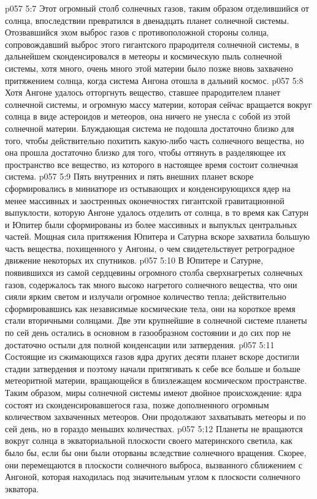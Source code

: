 \vs p057 5:7 Этот огромный столб солнечных газов, таким образом отделившийся от солнца, впоследствии превратился в двенадцать планет солнечной системы. Отозвавшийся эхом выброс газов с противоположной стороны солнца, сопровождавший выброс этого гигантского прародителя солнечной системы, в дальнейшем сконденсировался в метеоры и космическую пыль солнечной системы, хотя много, очень много этой материи было позже вновь захвачено притяжением солнца, когда система Ангона отошла в дальний космос.
\vs p057 5:8 Хотя Ангоне удалось отторгнуть вещество, ставшее прародителем планет солнечной системы, и огромную массу материи, которая сейчас вращается вокруг солнца в виде астероидов и метеоров, она ничего не унесла с собой из этой солнечной материи. Блуждающая система не подошла достаточно близко для того, чтобы действительно похитить какую\hyp{}либо часть солнечного вещества, но она прошла достаточно близко для того, чтобы оттянуть в разделяющее их пространство все вещество, из которого в настоящее время состоит солнечная система.
\vs p057 5:9 Пять внутренних и пять внешних планет вскоре сформировались в миниатюре из остывающих и конденсирующихся ядер на менее массивных и заостренных оконечностях гигантской гравитационной выпуклости, которую Ангоне удалось отделить от солнца, в то время как Сатурн и Юпитер были сформированы из более массивных и выпуклых центральных частей. Мощная сила притяжения Юпитера и Сатурна вскоре захватила большую часть вещества, похищенного у Ангоны, о чем свидетельствует ретроградное движение некоторых их спутников.
\vs p057 5:10 В Юпитере и Сатурне, появившихся из самой сердцевины огромного столба сверхнагретых солнечных газов, содержалось так много высоко нагретого солнечного вещества, что они сияли ярким светом и излучали огромное количество тепла; действительно сформировавшись как независимые космические тела, они на короткое время стали вторичными солнцами. Две эти крупнейшие в солнечной системе планеты по сей день остались в основном в газообразном состоянии и до сих пор не достаточно остыли для полной конденсации или затвердения.
\vs p057 5:11 Состоящие из сжимающихся газов ядра других десяти планет вскоре достигли стадии затвердения и поэтому начали притягивать к себе все больше и больше метеоритной материи, вращающейся в близлежащем космическом пространстве. Таким образом, миры солнечной системы имеют двойное происхождение: ядра состоят из сконденсировавшегося газа, позже дополненного огромным количеством захваченных метеоров. Они продолжают захватывать метеоры и по сей день, но в гораздо меньших количествах.
\vs p057 5:12 Планеты не вращаются вокруг солнца в экваториальной плоскости своего материнского светила, как было бы, если бы они были оторваны вследствие солнечного вращения. Скорее, они перемещаются в плоскости солнечного выброса, вызванного сближением с Ангоной, которая находилась под значительным углом к плоскости солнечного экватора.
